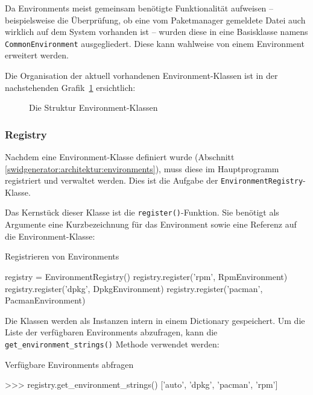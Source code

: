 Da Environments meist gemeinsam benötigte Funktionalität aufweisen --
beispielsweise die Überprüfung, ob eine vom Paketmanager gemeldete Datei auch
wirklich auf dem System vorhanden ist -- wurden diese in eine Basisklasse namens
\texttt{CommonEnvironment} ausgegliedert. Diese kann wahlweise von einem
Environment erweitert werden.

Die Organisation der aktuell vorhandenen Environment-Klassen ist in der nachstehenden Grafik~\ref{img:environment-klassendiagramm} ersichtlich:

\begin{figure}[H]
	\centering
	\resizebox{\textwidth}{!}{%
		
	}
	\caption{Die Struktur Environment-Klassen}
	\label{img:environment-klassendiagramm}
\end{figure}


\subsubsection{Registry}
\label{swidgenerator:architektur:environments:registry}

Nachdem eine Environment-Klasse definiert wurde (Abschnitt
\ref{swidgenerator:architektur:environments}), muss diese im Hauptprogramm
registriert und verwaltet werden. Dies ist die Aufgabe der
\texttt{EnvironmentRegistry}-Klasse.

Das Kernstück dieser Klasse ist die \texttt{register()}-Funktion. Sie benötigt als
Argumente eine Kurzbezeichnung für das Environment sowie eine Referenz auf die
Environment-Klasse:
\begin{listing}[H]
\caption{Registrieren von Environments}
\begin{pythoncode}
registry = EnvironmentRegistry()
registry.register('rpm', RpmEnvironment)
registry.register('dpkg', DpkgEnvironment)
registry.register('pacman', PacmanEnvironment)
\end{pythoncode}
\end{listing}

Die Klassen werden als Instanzen intern in einem Dictionary gespeichert. Um die
Liste der verfügbaren Environments abzufragen, kann die
\texttt{get\_environment\_strings()} Methode verwendet werden:

\begin{listing}[H]
\caption{Verfügbare Environments abfragen}
\begin{pythoncode}
>>> registry.get_environment_strings()
['auto', 'dpkg', 'pacman', 'rpm']
\end{pythoncode}
\end{listing}

